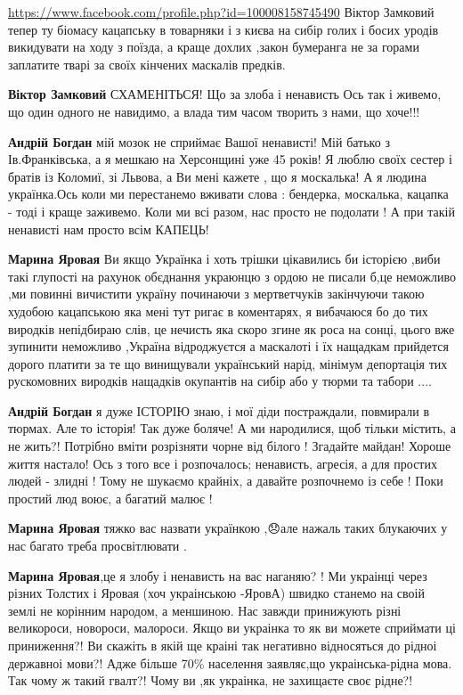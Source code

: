 \begin{itemize}
\begin{itemize}

\url{https://www.facebook.com/profile.php?id=100008158745490}
Віктор Замковий тепер ту біомасу кацапську в товарняки і з києва на сибір голих і босих уродів викидувати на ходу з поїзда, а краще дохлих ,закон бумеранга не за горами заплатите тварі за своїх кінчених маскалів предків.

\textbf{Віктор Замковий} СХАМЕНІТЬСЯ! Що за злоба і ненависть Ось так і живемо,
що один одного не навидимо, а влада тим часом творить з нами, що хоче!!!

\textbf{Андрій Богдан} мій мозок не сприймає Вашої ненависті! Мій батько з
Ів.Франківська, а я мешкаю на Херсонщині уже 45 років! Я люблю своїх сестер і
братів із Коломиї, зі Львова, а Ви мені кажете , що я москалька! А я людина
українка.Ось коли ми перестанемо вживати слова : бендерка, москалька, кацапка -
тоді і краще заживемо. Коли ми всі разом, нас просто не подолати ! А при такій
ненависті нам просто всім КАПЕЦЬ!

\textbf{Марина Яровая} Ви якщо Українка і хоть трішки цікавились би історією
,виби такі глупості на рахунок обєднання украюнцю з ордою не писали б,це
неможливо ,ми повинні вичистити україну починаючи з мертветчуків закінчуючи
такою худобою кацапською яка мені тут ригає в коментарях, я вибачаюся бо до тих
виродків непідбираю слів, це нечисть яка скоро згине як роса на сонці, цього
вже зупинити неможливо ,Україна відроджуєтся а маскалоті і їх нащадкам
прийдется дорого платити за те що винищували український нарід, мінімум
депортація тих рускомовних виродків нащадків окупантів на сибір або у тюрми та
табори ....


\textbf{Андрій Богдан} я дуже ІСТОРІЮ знаю, і мої діди постраждали, повмирали в
тюрмах. Але то історія! Так дуже боляче! А ми народилися, щоб тільки містить, а
не жить?! Потрібно вміти розрізняти чорне від білого ! Згадайте майдан! Хороше
життя настало! Ось з того все і розпочалось; ненависть, агресія, а для простих
людей - злидні ! Тому не шукаємо крайніх, а давайте розпочнемо із себе ! Поки
простий люд воює, а багатий малює !

\textbf{Марина Яровая} тяжко вас назвати українкою ,😞але нажаль таких блукаючих у нас багато треба просвітлювати .


\textbf{Марина Яровая},це я злобу і ненависть на вас наганяю? ! Ми украінці
через різних Толстих і Яровая (хоч украінською -ЯровА) швидко станемо на своій
землі не корінним народом, а меншиною. Нас завжди принижують різні великороси,
новороси, малороси. Якщо ви украінка то як ви можете сприймати ці приниження?!
Ви скажіть в якій ще краіні так негативно відносяться до рідноі державноі
мови?! Адже більше 70\% населення заявляє,що украінська-рідна мова. Так чому ж
такий гвалт?! Чому ви ,як украінка, не захищаєте своє рідне?!


\end{itemize}
\end{itemize}
